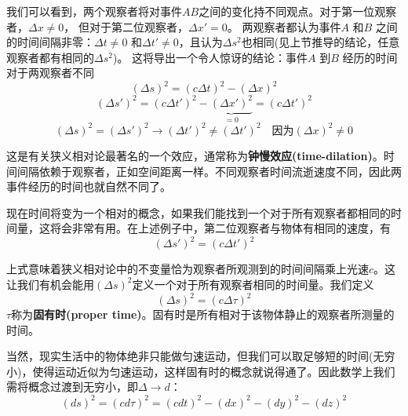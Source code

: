 我们可以看到，两个观察者将对事件$AB$之间的变化持不同观点。对于第一位观察者，$\Delta x \neq 0$， 但对于第二位观察者，$\Delta x' = 0$。 两观察者都认为事件$A$ 和$B$ 之间的时间间隔非零：$\Delta t \neq 0$ 和$\Delta t' \neq 0$，且认为$\Delta s^2$也相同(见上节推导的结论，任意观察者都有相同的$\Delta s^2$)。 这将导出一个令人惊讶的结论：事件$A$ 到$B$ 经历的时间对于两观察者不同
\begin{equation}\label{equ2.14}
  (\Delta s)^2
  =(c\Delta t)^2
  -(\Delta x)^2
\end{equation}
\begin{equation}\label{equ2.15}
  (\Delta s')^2
  =(c\Delta t')^2
  -\underbrace{(\Delta x')^2}_{=0}
  =(c\Delta t')^2
\end{equation}
\begin{equation}\label{equ2.16}
   (\Delta s)^2
   = (\Delta s')^2
   \rightarrow
    (\Delta t')^2 \neq
     (\Delta t')^2
     \quad \text{因为}  (\Delta x)^2 \neq 0
\end{equation}

这是有关狭义相对论最著名的一个效应，通常称为{\bf{钟慢效应(time-dilation)}}。时间间隔依赖于观察者，正如空间距离一样。不同观察者时间流逝速度不同，因此两事件经历的时间也就自然不同了。

现在时间将变为一个相对的概念，如果我们能找到一个对于所有观察者都相同的时间量，这将会非常有用。在上述例子中，第二位观察者与物体有相同的速度，有
\begin{equation}\label{equ2.17}
  (\Delta s')^2
  =(c\Delta t')^2
\end{equation}

上式意味着狭义相对论中的不变量恰为观察者所观测到的时间间隔乘上光速$c$。这让我们有机会能用$(\Delta s)^2$定义一个对于所有观察者相同的时间量。我们定义
\begin{equation}\label{equ2.18}
  (\Delta s)^2
  =(c\Delta \tau)^2
\end{equation}
$\tau$称为{\bf{固有时(proper time)}}。固有时是所有相对于该物体静止的观察者所测量的时间。

当然，现实生活中的物体绝非只能做匀速运动，但我们可以取足够短的时间(无穷小)，使得运动近似为匀速运动，这样固有时的概念就说得通了。因此数学上我们需将概念过渡到无穷小，即$\Delta \rightarrow d$：
\begin{equation}\label{equ2.19}
  (ds)^2  =(cd \tau )^2=(cdt)^2-(dx)^2-(dy)^2-(dz)^2
\end{equation}

